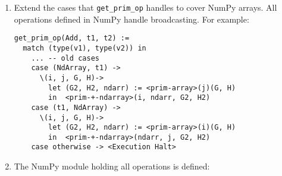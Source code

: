\begin{enumerate}
  Note: The values stored inside a NumPy array are consider irrelevant
  in this work. The Value Analysis built in this work considers only the
  shape of tensors, as tensors can be huge and their contents do not
  often influence their shape. Therefore, it would be wasteful to give a
  detailed formalisation of the NumPy library primitives.

  Nonetheless, defining formaly each one of the NumPy functions above is
  fairly straightforward. Although, the hardest part of a formal
  defitinion of Numpy arrays is detailing how \texttt{array} works. To
  define the function \texttt{\textless{}np-array\textgreater{}} one
  must consider the many input cases it can handle, and it can handle
  almost any Python object\footnote{The NumPy function \texttt{array}
    takes almost anything as an input. \texttt{arrays} tries to
    interpret its input as an array in any way it can. There is no
    formal definition of how the values are interpreted althought its
    semantics can be extracted by looking at its C implementation:
    https://stackoverflow.com/a/40380014}.

  Once the \texttt{\textless{}np-array\textgreater{}} function is
  implemented all other functions are much simpler to define. As an
  example, the implementation of the function \texttt{size} is:

\begin{verbatim}
<prim-np-size>(val)(G, H) :=
   -- We know that `<prim-array>` always returns an NdArray
   let (G, H, (NdArray, addr, arr)) := <prim-array>(val)(G, H)
   -- We know that a NdArray has a special value called `shape`
       (Tuple, addrtup, tup) := arr('shape')
   in  tup('size')
\end{verbatim}
\item
  Extend the cases that \texttt{get\_prim\_op} handles to cover NumPy
  arrays. All operations defined in NumPy handle broadcasting.
  {} For example:

\begin{verbatim}
get_prim_op(Add, t1, t2) :=
  match (type(v1), type(v2)) in
    ... -- old cases
    case (NdArray, t1) ->
      \(i, j, G, H)->
        let (G2, H2, ndarr) := <prim-array>(j)(G, H)
        in  <prim-+-ndarray>(i, ndarr, G2, H2)
    case (t1, NdArray) ->
      \(i, j, G, H)->
        let (G2, H2, ndarr) := <prim-array>(i)(G, H)
        in  <prim-+-ndarray>(ndarr, j, G2, H2)
    case otherwise -> <Execution Halt>
\end{verbatim}
\item
  The NumPy module holding all operations is defined:


\end{enumerate}
